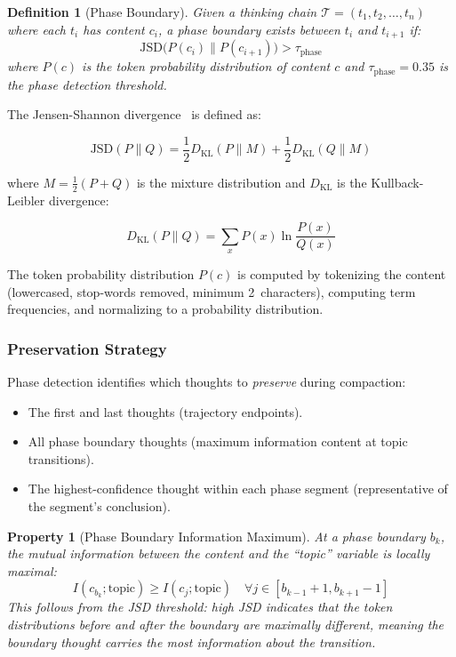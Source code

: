 \documentclass[journal,10pt]{IEEEtran}
\newtheorem{definition}{Definition}
\newtheorem{property}{Property}
\begin{document}
\begin{definition}[Phase Boundary]
\label{def:phase}
Given a thinking chain $\mathcal{T} = (t_1, t_2, \ldots, t_n)$ where each $t_i$ has content $c_i$, a \emph{phase boundary} exists between $t_i$ and $t_{i+1}$ if:
\begin{equation}
\text{JSD}\bigl(P(c_i) \| P(c_{i+1})\bigr) > \tau_{\text{phase}}
\label{eq:phase}
\end{equation}
where $P(c)$ is the token probability distribution of content $c$ and $\tau_{\text{phase}} = 0.35$ is the phase detection threshold.
\end{definition}

The Jensen-Shannon divergence~\cite{lin1991} is defined as:

\begin{equation}
\text{JSD}(P \| Q) = \frac{1}{2} D_{\text{KL}}(P \| M) + \frac{1}{2} D_{\text{KL}}(Q \| M)
\label{eq:jsd}
\end{equation}

\noindent where $M = \frac{1}{2}(P + Q)$ is the mixture distribution and $D_{\text{KL}}$ is the Kullback-Leibler divergence:

\begin{equation}
D_{\text{KL}}(P \| Q) = \sum_{x} P(x) \ln \frac{P(x)}{Q(x)}
\label{eq:kl}
\end{equation}

The token probability distribution $P(c)$ is computed by tokenizing the content (lowercased, stop-words removed, minimum 2~characters), computing term frequencies, and normalizing to a probability distribution.

\subsubsection{Preservation Strategy}

Phase detection identifies which thoughts to \emph{preserve} during compaction:

\begin{itemize}[nosep]
\item The first and last thoughts (trajectory endpoints).
\item All phase boundary thoughts (maximum information content at topic transitions).
\item The highest-confidence thought within each phase segment (representative of the segment's conclusion).
\end{itemize}

\begin{property}[Phase Boundary Information Maximum]
\label{prop:boundary}
At a phase boundary $b_k$, the mutual information between the content and the ``topic'' variable is locally maximal:
\begin{equation}
I(c_{b_k}; \text{topic}) \geq I(c_j; \text{topic}) \quad \forall j \in [b_{k-1}+1, b_{k+1}-1]
\label{eq:mutual}
\end{equation}
This follows from the JSD threshold: high JSD indicates that the token distributions before and after the boundary are maximally different, meaning the boundary thought carries the most information about the transition.
\end{property}
\end{document}
